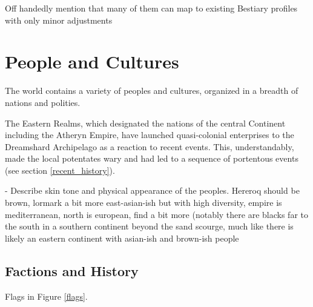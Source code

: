 Off handedly mention that many of them can map to existing Bestiary profiles with only minor adjustments



\section{People and Cultures}

The world contains a variety of peoples and cultures, organized in a breadth of nations and polities.

The Eastern Realms, which designated the nations of the central Continent including the Atheryn Empire, have launched quasi-colonial enterprises to the Dreamshard Archipelago as a reaction to recent events. This, understandably, made the local potentates wary and had led to a sequence of portentous events (see section \ref{recent_history}).






- Describe skin tone and physical appearance of the peoples. Hereroq should be brown, lormark a bit more east-asian-ish but with high diversity, empire is mediterranean, north is european, find a bit more (notably there are blacks far to the south in a southern continent beyond the sand scourge, much like there is likely an eastern continent with asian-ish and brown-ish people



\subsection{Factions and History}

Flags in Figure \ref{flags}.

